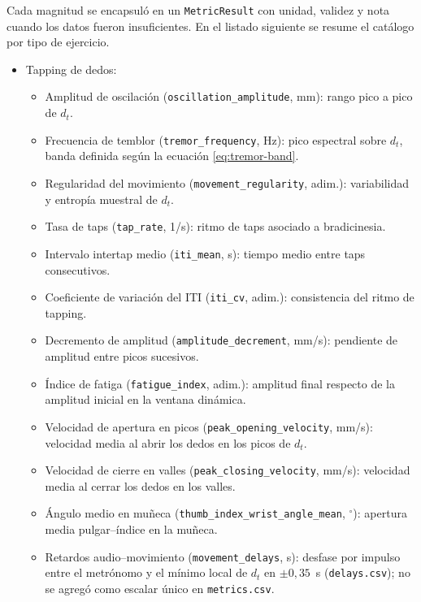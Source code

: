 Cada magnitud se encapsuló en un \texttt{MetricResult} con unidad, validez y nota cuando los datos fueron insuficientes. En el listado siguiente se resume el catálogo por tipo de ejercicio.\label{sec:metricas-implementadas}

\begin{sloppypar}
\begin{itemize}
    \item Tapping de dedos:
    \begin{itemize}
        \item Amplitud de oscilación (\texttt{oscillation\_\allowbreak{}amplitude}, mm): rango pico a pico de $d_t$.
        \item Frecuencia de temblor (\texttt{tremor\_\allowbreak{}frequency}, Hz): pico espectral sobre $d_t$, banda definida según la ecuación \ref{eq:tremor-band}.
        \item Regularidad del movimiento (\texttt{movement\_\allowbreak{}regularity}, adim.): variabilidad y entropía muestral de $d_t$.
        \item Tasa de taps (\texttt{tap\_rate}, 1/s): ritmo de taps asociado a bradicinesia.
        \item Intervalo intertap medio (\texttt{iti\_mean}, s): tiempo medio entre taps consecutivos.
        \item Coeficiente de variación del ITI (\texttt{iti\_cv}, adim.): consistencia del ritmo de tapping.
        \item Decremento de amplitud (\texttt{amplitude\_\allowbreak{}decrement}, mm/s): pendiente de amplitud entre picos sucesivos.
        \item Índice de fatiga (\texttt{fatigue\_\allowbreak{}index}, adim.): amplitud final respecto de la amplitud inicial en la ventana dinámica.
        \item Velocidad de apertura en picos (\texttt{peak\_\allowbreak{}opening\_\allowbreak{}velocity}, mm/s): velocidad media al abrir los dedos en los picos de $d_t$.
        \item Velocidad de cierre en valles (\texttt{peak\_\allowbreak{}closing\_\allowbreak{}velocity}, mm/s): velocidad media al cerrar los dedos en los valles.
        \item Ángulo medio en muñeca (\texttt{thumb\_\allowbreak{}index\_\allowbreak{}wrist\_\allowbreak{}angle\_\allowbreak{}mean}, $^{\circ}$): apertura media pulgar--índice en la muñeca.
        \item Retardos audio--movimiento (\texttt{movement\_\allowbreak{}delays}, s): desfase por impulso entre el metrónomo y el mínimo local de $d_t$ en $\pm 0{,}35$~s (\texttt{delays.csv}); no se agregó como escalar único en \texttt{metrics.csv}.
    \end{itemize}


\end{itemize}
\end{sloppypar}
